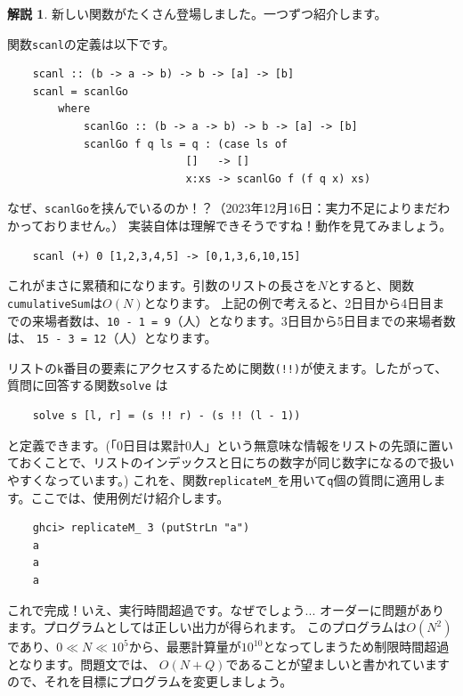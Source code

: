 \documentclass[12pt,a4paper,dvipdfmx,fleqn]{article}%
\theoremstyle{definition}
\theoremstyle{definition}
\newtheorem*{ans*}{解説}
\theoremstyle{definition}
\begin{document}
\begin{ans*}
    新しい関数がたくさん登場しました。一つずつ紹介します。\par
    関数\texttt{scanl}の定義は以下です。
    \begin{verbatim}
    scanl :: (b -> a -> b) -> b -> [a] -> [b]
    scanl = scanlGo
        where
            scanlGo :: (b -> a -> b) -> b -> [a] -> [b]
            scanlGo f q ls = q : (case ls of
                            []   -> []
                            x:xs -> scanlGo f (f q x) xs)
    \end{verbatim}
    \vspace*{-4mm}
    なぜ、\texttt{scanlGo}を挟んでいるのか！？（2023年12月16日：実力不足によりまだわかっておりません。）
    実装自体は理解できそうですね！動作を見てみましょう。
    \begin{verbatim}
    scanl (+) 0 [1,2,3,4,5] -> [0,1,3,6,10,15]
    \end{verbatim}
    \vspace*{-4mm}
    これがまさに累積和になります。引数のリストの長さを$N$とすると、関数\texttt{cumulativeSum}は$O(N)$となります。
    上記の例で考えると、2日目から4日目までの来場者数は、\texttt{10 - 1 = 9}（人）となります。3日目から5日目までの来場者数は、
    \texttt{15 - 3 = 12}（人）となります。\par
    リストの\texttt{k}番目の要素にアクセスするために関数\texttt{(!!)}が使えます。したがって、質問に回答する関数\texttt{solve}
    は
    \begin{verbatim}
    solve s [l, r] = (s !! r) - (s !! (l - 1))
    \end{verbatim}
    \vspace*{-4mm}
    と定義できます。(「0日目は累計0人」という無意味な情報をリストの先頭に置いておくことで、リストのインデックスと日にちの数字が同じ数字になるので扱いやすくなっています。)
    これを、関数\texttt{replicateM\_}を用いて\texttt{q}個の質問に適用します。ここでは、使用例だけ紹介します。
    \begin{verbatim}
    ghci> replicateM_ 3 (putStrLn "a")
    a
    a
    a
    \end{verbatim}
    \vspace*{-4mm}
    \par
    これで完成！いえ、実行時間超過です。なぜでしょう... オーダーに問題があります。プログラムとしては正しい出力が得られます。
    このプログラムは$O(N^2)$であり、$0\ll N\ll 10^5$から、最悪計算量が$10^{10}$となってしまうため制限時間超過となります。問題文では、
    $O(N+Q)$であることが望ましいと書かれていますので、それを目標にプログラムを変更しましょう。\par

\end{ans*}
\end{document}
